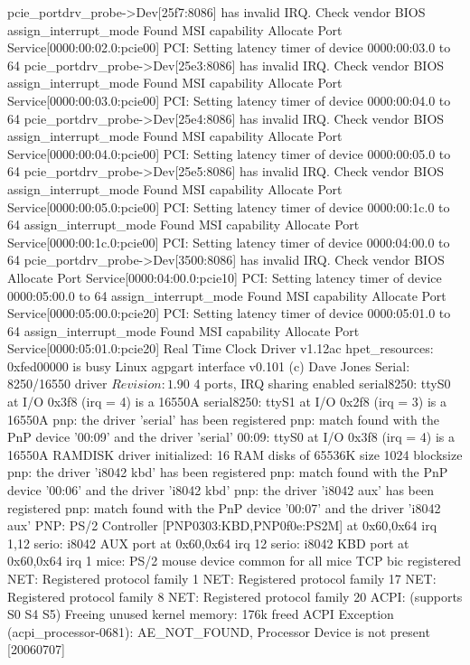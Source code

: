 \documentclass[mingoth,a4paper]{jsarticle}
\begin{document}
{{{{{{{{\begin{commandline}
pcie_portdrv_probe->Dev[25f7:8086] has invalid IRQ. Check vendor BIOS
assign_interrupt_mode Found MSI capability
Allocate Port Service[0000:00:02.0:pcie00]
PCI: Setting latency timer of device 0000:00:03.0 to 64
pcie_portdrv_probe->Dev[25e3:8086] has invalid IRQ. Check vendor BIOS
assign_interrupt_mode Found MSI capability
Allocate Port Service[0000:00:03.0:pcie00]
PCI: Setting latency timer of device 0000:00:04.0 to 64
pcie_portdrv_probe->Dev[25e4:8086] has invalid IRQ. Check vendor BIOS
assign_interrupt_mode Found MSI capability
Allocate Port Service[0000:00:04.0:pcie00]
PCI: Setting latency timer of device 0000:00:05.0 to 64
pcie_portdrv_probe->Dev[25e5:8086] has invalid IRQ. Check vendor BIOS
assign_interrupt_mode Found MSI capability
Allocate Port Service[0000:00:05.0:pcie00]
PCI: Setting latency timer of device 0000:00:1c.0 to 64
assign_interrupt_mode Found MSI capability
Allocate Port Service[0000:00:1c.0:pcie00]
PCI: Setting latency timer of device 0000:04:00.0 to 64
pcie_portdrv_probe->Dev[3500:8086] has invalid IRQ. Check vendor BIOS
Allocate Port Service[0000:04:00.0:pcie10]
PCI: Setting latency timer of device 0000:05:00.0 to 64
assign_interrupt_mode Found MSI capability
Allocate Port Service[0000:05:00.0:pcie20]
PCI: Setting latency timer of device 0000:05:01.0 to 64
assign_interrupt_mode Found MSI capability
Allocate Port Service[0000:05:01.0:pcie20]
Real Time Clock Driver v1.12ac
hpet_resources: 0xfed00000 is busy
Linux agpgart interface v0.101 (c) Dave Jones
Serial: 8250/16550 driver $Revision: 1.90 $ 4 ports, IRQ sharing enabled
serial8250: ttyS0 at I/O 0x3f8 (irq = 4) is a 16550A
serial8250: ttyS1 at I/O 0x2f8 (irq = 3) is a 16550A
pnp: the driver 'serial' has been registered
pnp: match found with the PnP device '00:09' and the driver 'serial'
00:09: ttyS0 at I/O 0x3f8 (irq = 4) is a 16550A
RAMDISK driver initialized: 16 RAM disks of 65536K size 1024 blocksize
pnp: the driver 'i8042 kbd' has been registered
pnp: match found with the PnP device '00:06' and the driver 'i8042 kbd'
pnp: the driver 'i8042 aux' has been registered
pnp: match found with the PnP device '00:07' and the driver 'i8042 aux'
PNP: PS/2 Controller [PNP0303:KBD,PNP0f0e:PS2M] at 0x60,0x64 irq 1,12
serio: i8042 AUX port at 0x60,0x64 irq 12
serio: i8042 KBD port at 0x60,0x64 irq 1
mice: PS/2 mouse device common for all mice
TCP bic registered
NET: Registered protocol family 1
NET: Registered protocol family 17
NET: Registered protocol family 8
NET: Registered protocol family 20
ACPI: (supports S0 S4 S5)
Freeing unused kernel memory: 176k freed
ACPI Exception (acpi_processor-0681): AE_NOT_FOUND, Processor Device is not present [20060707]

\end{commandline}}}}}}}}}
\end{document}
